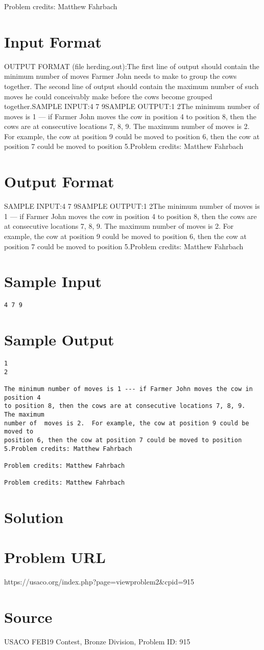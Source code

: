 \documentclass[12pt]{article}
\begin{document}
Problem credits: Matthew Fahrbach



\section*{Input Format}
OUTPUT FORMAT (file herding.out):The first line of output should contain the minimum number of moves Farmer John
needs to make to group the cows together.  The second line of output should
contain the maximum number of such moves he could conceivably make before the
cows become grouped together.SAMPLE INPUT:4 7 9SAMPLE OUTPUT:1
2The minimum number of moves is 1 --- if Farmer John moves the cow in position 4
to position 8, then the cows are at consecutive locations 7, 8, 9.  The maximum
number of  moves is 2.  For example, the cow at position 9 could be moved to
position 6, then the cow at position 7 could be moved to position 5.Problem credits: Matthew Fahrbach

\section*{Output Format}
SAMPLE INPUT:4 7 9SAMPLE OUTPUT:1
2The minimum number of moves is 1 --- if Farmer John moves the cow in position 4
to position 8, then the cows are at consecutive locations 7, 8, 9.  The maximum
number of  moves is 2.  For example, the cow at position 9 could be moved to
position 6, then the cow at position 7 could be moved to position 5.Problem credits: Matthew Fahrbach

\section*{Sample Input}
\begin{verbatim}
4 7 9
\end{verbatim}

\section*{Sample Output}
\begin{verbatim}
1
2

The minimum number of moves is 1 --- if Farmer John moves the cow in position 4
to position 8, then the cows are at consecutive locations 7, 8, 9.  The maximum
number of  moves is 2.  For example, the cow at position 9 could be moved to
position 6, then the cow at position 7 could be moved to position 5.Problem credits: Matthew Fahrbach

Problem credits: Matthew Fahrbach

Problem credits: Matthew Fahrbach
\end{verbatim}

\section*{Solution}


\section*{Problem URL}
https://usaco.org/index.php?page=viewproblem2&cpid=915

\section*{Source}
USACO FEB19 Contest, Bronze Division, Problem ID: 915
\end{document}
